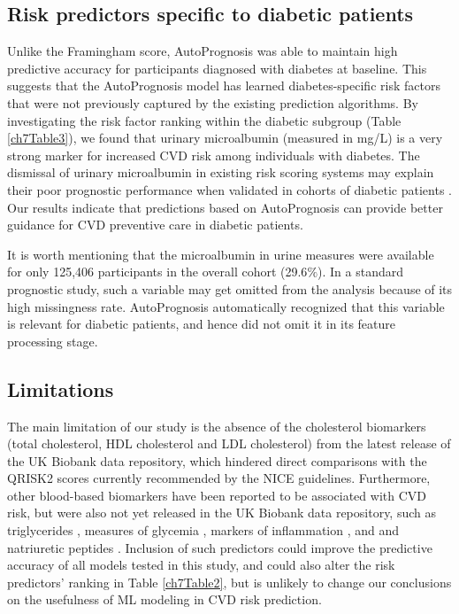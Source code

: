 \documentclass [PhD] {uclathes}
\begin{document}
\subsection*{Risk predictors specific to diabetic patients}
Unlike the Framingham score, AutoPrognosis was able to maintain high predictive accuracy for participants diagnosed with diabetes at baseline. This suggests that the AutoPrognosis model has learned diabetes-specific risk factors that were not previously captured by the existing prediction algorithms. By investigating the risk factor ranking within the diabetic subgroup (Table \ref{ch7Table3}), we found that urinary microalbumin (measured in mg/L) is a very strong marker for increased CVD risk among individuals with diabetes. The dismissal of urinary microalbumin in existing risk scoring systems may explain their poor prognostic performance when validated in cohorts of diabetic patients \cite{mcewan2004evaluating,coleman2007framingham}. Our results indicate that predictions based on AutoPrognosis can provide better guidance for CVD preventive care in diabetic patients. 
    
It is worth mentioning that the microalbumin in urine measures were available for only 125,406 participants in the overall cohort (29.6$\%$). In a standard prognostic study, such a variable may get omitted from the analysis because of its high missingness rate. AutoPrognosis automatically recognized that this variable is relevant for diabetic patients, and hence did not omit it in its feature processing stage.

\subsection*{Limitations}
The main limitation of our study is the absence of the cholesterol biomarkers (total cholesterol, HDL cholesterol and LDL cholesterol) from the latest release of the UK Biobank data repository, which hindered direct comparisons with the QRISK2 scores currently recommended by the NICE guidelines. Furthermore, other blood-based biomarkers have been reported to be associated with CVD risk, but were also not yet released in the UK Biobank data repository, such as triglycerides \cite{assmann2002simple}, measures of glycemia \cite{Peeg2010new}, markers of inflammation \cite{emerging2012c}, and and natriuretic peptides \cite{willeit2016natriuretic}. Inclusion of such predictors could improve the predictive accuracy of all models tested in this study, and could also alter the risk predictors' ranking in Table \ref{ch7Table2}, but is unlikely to change our conclusions on the usefulness of ML modeling in CVD risk prediction.  
\end{document}
